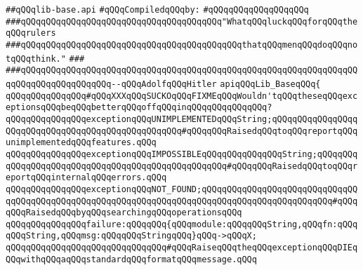 \label{src/lib/src/lib-base.api}
\verb|##qQQqlib-base.api|\newline
\newline
\verb|#qQQqCompiledqQQqby:|\newline
\verb|#qQQqqQQqqQQqqQQqqQQq|\newline
\newline
\newline
\newline
\verb|###qQQqqQQqqQQqqQQqqQQqqQQqqQQqqQQqqQQqqQQq"WhatqQQqluckqQQqforqQQqtheqQQqrulers|\newline
\verb|###qQQqqQQqqQQqqQQqqQQqqQQqqQQqqQQqqQQqqQQqqQQqthatqQQqmenqQQqdoqQQqnotqQQqthink."|\newline
\verb|###|\newline
\verb|###qQQqqQQqqQQqqQQqqQQqqQQqqQQqqQQqqQQqqQQqqQQqqQQqqQQqqQQqqQQqqQQqqQQqqQQqqQQqqQQqqQQqqQQq--qQQqAdolfqQQqHitler|\newline
\newline
\newline
\newline
\verb|apiqQQqLib_BaseqQQq{|\newline
\newline
\verb|qQQqqQQqqQQqqQQq#qQQqXXXqQQqSUCKOqQQqFIXMEqQQqWouldn'tqQQqtheseqQQqexceptionsqQQqbeqQQqbetterqQQqoffqQQqinqQQqqQQq|\verb|qQQqqQQq?|\newline
\newline
\verb|qQQqqQQqqQQqqQQqexceptionqQQqUNIMPLEMENTEDqQQqString;qQQqqQQqqQQqqQQqqQQqqQQqqQQqqQQqqQQqqQQqqQQqqQQqqQQq#qQQqqQQqRaisedqQQqtoqQQqreportqQQqunimplementedqQQqfeatures.qQQq|\newline
\verb|qQQqqQQqqQQqqQQqexceptionqQQqIMPOSSIBLEqQQqqQQqqQQqqQQqString;qQQqqQQqqQQqqQQqqQQqqQQqqQQqqQQqqQQqqQQqqQQqqQQqqQQq#qQQqqQQqRaisedqQQqtoqQQqreportqQQqinternalqQQqerrors.qQQq|\newline
\verb|qQQqqQQqqQQqqQQqexceptionqQQqNOT_FOUND;qQQqqQQqqQQqqQQqqQQqqQQqqQQqqQQqqQQqqQQqqQQqqQQqqQQqqQQqqQQqqQQqqQQqqQQqqQQqqQQqqQQqqQQqqQQqqQQq#qQQqqQQqRaisedqQQqbyqQQqsearchingqQQqoperationsqQQq|\newline
\newline
\verb|qQQqqQQqqQQqqQQqfailure:qQQqqQQq{qQQqmodule:qQQqqQQqString,qQQqfn:qQQqqQQqString,qQQqmsg:qQQqqQQqStringqQQq}qQQq->qQQqX;|\newline
\newline
\verb|qQQqqQQqqQQqqQQqqQQqqQQqqQQqqQQq#qQQqRaiseqQQqtheqQQqexceptionqQQqDIEqQQqwithqQQqaqQQqstandardqQQqformatqQQqmessage.qQQq|\newline
